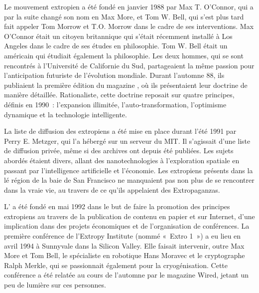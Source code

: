 Le mouvement extropien a été fondé en janvier 1988 par Max T. O'Connor, qui a par la suite changé son nom en Max More, et Tom W. Bell, qui s'est plus tard fait appeler Tom Morrow et T.O. Morrow dans le cadre de ses interventions. Max O'Connor était un citoyen britannique qui s'était récemment installé à Los Angeles dans le cadre de ses études en philosophie. Tom W. Bell était un américain qui étudiait également la philosophie. Les deux hommes, qui se sont rencontrés à l'Université de Californie du Sud, partageaient la même passion pour l'anticipation futuriste de l'évolution mondiale. Durant l'automne 88, ils publiaient la première édition du magazine , où ils présentaient leur doctrine de manière détaillée. Rationaliste, cette doctrine reposait sur quatre principes, définis en 1990~: l'expansion illimitée, l'auto-transformation, l'optimisme dynamique et la technologie intelligente.

La liste de diffusion des extropiens a été mise en place durant l'été 1991 par Perry E. Metzger, qui l'a hébergé sur un serveur du MIT. Il s'agissait d'une liste de diffusion privée, même si des archives ont depuis été publiées. Les sujets abordés étaient divers, allant des nanotechnologies à l'exploration spatiale en passant par l'intelligence artificielle et l'économie. Les extropiens présents dans la lé région de la baie de San Francisco ne manquaient pas non plus de se rencontrer dans la vraie vie, au travers de ce qu'ils appelaient des Extropaganzas.

L' a été fondé en mai 1992 dans le but de faire la promotion des principes extropiens au travers de la publication de contenu en papier et sur Internet, d'une implication dans des projets économiques et de l'organisation de conférences. La première conférence de l'Extropy Institute (nommé «~Extro 1~») a eu lieu en avril 1994 à Sunnyvale dans la Silicon Valley. Elle faisait intervenir, outre Max More et Tom Bell, le spécialiste en robotique Hans Moravec et le cryptographe Ralph Merkle, qui se passionnait également pour la cryogénisation. Cette conférence a été relatée au cours de l'automne par le magazine Wired, jetant un peu de lumière sur ces personnes.

